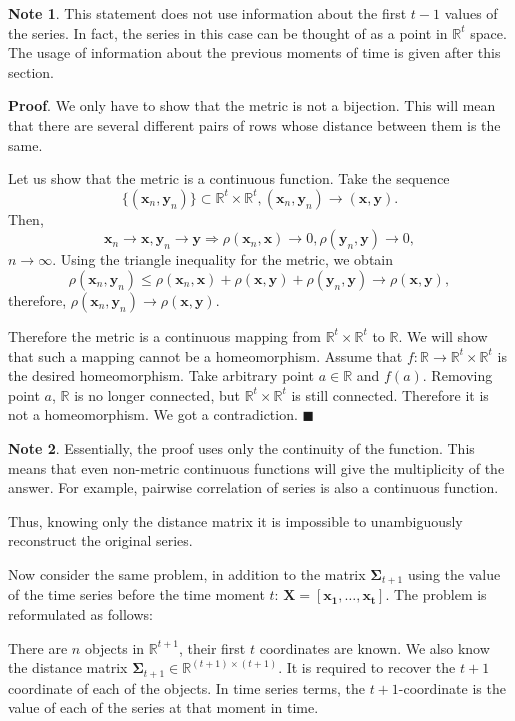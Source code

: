 \documentclass{article}
\begin{document}
\textbf{Note 1}. This statement does not use information about the first $t-1$ values of the series. In fact, the series in this case can be thought of as a point in $\mathbb{R}^t$ space. The usage of information about the previous moments of time is given after this section.

\textbf{Proof}. We only have to show that the metric is not a bijection. This will mean that there are several different pairs of rows whose distance between them is the same.

Let us show that the metric is a continuous function. Take the sequence \[\{(\mathbf{x}_n, \mathbf{y}_n)\} \subset \mathbb{R}^t \times \mathbb{R}^t, (\mathbf{x}_n, \mathbf{y}_n) \to (\mathbf{x}, \mathbf{y}).\] Then, \[\mathbf{x}_n\to \mathbf{x}, \mathbf{y}_n\to \mathbf{y} \Rightarrow \rho(\mathbf{x}_n,\mathbf{x})\to 0 ,\rho(\mathbf{y}_n,\mathbf{y})\to 0,\] $n \to \infty.$ Using the triangle inequality for the metric, we obtain \[\rho(\mathbf{x}_n,\mathbf{y}_n)\leqslant \rho(\mathbf{x}_n,\mathbf{x})+\rho(\mathbf{x},\mathbf{y})+\rho(\mathbf{y}_n,\mathbf{y})\to \rho(\mathbf{x},\mathbf{y}),\] therefore, $\rho(\mathbf{x}_n,\mathbf{y}_n)\to \rho(\mathbf{x},\mathbf{y})$.

Therefore the metric is a continuous mapping from $\mathbb{R}^t \times \mathbb{R}^t$ to $\mathbb{R}$. We will show that such a mapping cannot be a homeomorphism. Assume that $f: \mathbb{R} \to \mathbb{R}^t \times \mathbb{R}^t$ is the desired homeomorphism. Take arbitrary point $a \in \mathbb{R}$ and $f(a)$. Removing point $a$, $\mathbb{R}$ is no longer connected, but $\mathbb{R}^t \times \mathbb{R}^t$ is still connected. Therefore it is not a homeomorphism. We got a contradiction.
$\blacksquare$

\textbf{Note 2}. Essentially, the proof uses only the continuity of the function. This means that even non-metric continuous functions will give the multiplicity of the answer. For example, pairwise correlation of series is also a continuous function.

Thus, knowing only the distance matrix it is impossible to unambiguously reconstruct the original series.

Now consider the same problem, in addition to the matrix $\mathbf{\Sigma}_{t+1}$ using the value of the time series before the time moment $t$: $\mathbf{X}=[\mathbf{x_1}, \ldots, \mathbf{x_{t}}]$. The problem is reformulated as follows:

There are $n$ objects in $\mathbb{R}^{t+1}$, their first $t$ coordinates are known. We also know the distance matrix $\mathbf{\Sigma}_{t+1} \in \mathbb{R}^{(t+1) \times (t+1)}$. It is required to recover the $t+1$ coordinate of each of the objects. In time series terms, the $t+1$-coordinate is the value of each of the series at that moment in time.
\end{document}
